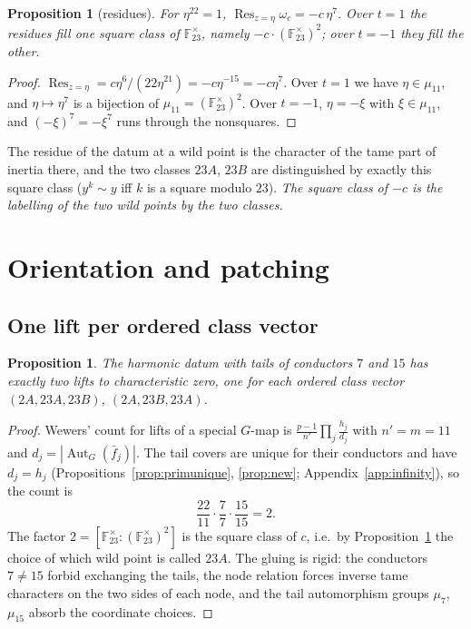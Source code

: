 \documentclass[11pt]{amsart}
\newcommand{\FF}{\mathbb{F}}
\newcommand{\Res}{\operatorname{Res}}
\newcommand{\Aut}{\operatorname{Aut}}
\theoremstyle{plain}
\newtheorem{proposition}[theorem]{Proposition}
\theoremstyle{definition}
\begin{document}
\begin{proposition}[residues]\label{prop:res}
For $\eta^{22}=1$, $\Res_{z=\eta}\omega_c=-c\,\eta^7$. Over $t=1$ the
residues fill one square class of $\FF_{23}^\times$, namely
$-c\cdot(\FF_{23}^\times)^2$; over $t=-1$ they fill the other.
\end{proposition}
\begin{proof}
$\Res_{z=\eta}=c\eta^6/(22\eta^{21})=-c\eta^{-15}=-c\eta^{7}$. Over
$t=1$ we have $\eta\in\mu_{11}$, and $\eta\mapsto\eta^7$ is a bijection
of $\mu_{11}=(\FF_{23}^\times)^2$. Over $t=-1$, $\eta=-\xi$ with
$\xi\in\mu_{11}$, and $(-\xi)^7=-\xi^7$ runs through the nonsquares.
\end{proof}

The residue of the datum at a wild point is the character of the
tame part of inertia there, and the two classes $23A$, $23B$ are
distinguished by exactly this square class ($y^k\sim y$ iff $k$ is a
square modulo $23$). \emph{The square class of $-c$ is the labelling
of the two wild points by the two classes.}

\section{Orientation and patching}\label{sec:patching}

\subsection{One lift per ordered class vector}

\begin{proposition}\label{prop:patch}
The harmonic datum with tails of conductors $7$ and $15$ has exactly
two lifts to characteristic zero, one for each ordered class vector
$(2A,23A,23B)$, $(2A,23B,23A)$.
\end{proposition}
\begin{proof}
Wewers' count \cite[Cor.~4.8]{Wewers} for lifts of a special
$G$-map is $\frac{p-1}{n'}\prod_j\frac{h_j}{d_j}$ with $n'=m=11$ and
$d_j=|\Aut_G(\bar f_j)|$. The tail covers are unique for their
conductors and have $d_j=h_j$ (Propositions~\ref{prop:primunique},
\ref{prop:new}; Appendix~\ref{app:infinity}), so the count is
\[
  \frac{22}{11}\cdot\frac77\cdot\frac{15}{15}=2 .
\]
The factor $2=[\FF_{23}^\times:(\FF_{23}^\times)^2]$ is the square
class of $c$, i.e.\ by Proposition~\ref{prop:res} the choice of which
wild point is called $23A$. The gluing is rigid: the conductors
$7\ne15$ forbid exchanging the tails, the node relation forces inverse
tame characters on the two sides of each node, and the tail
automorphism groups $\mu_7$, $\mu_{15}$ absorb the coordinate choices.
\end{proof}
\end{document}
